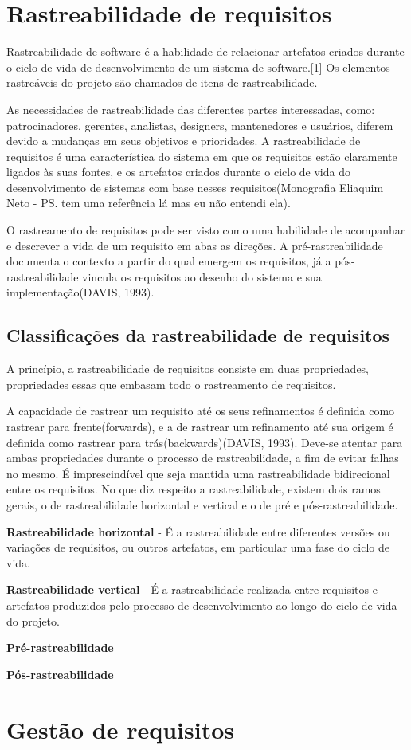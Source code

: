 \section{Rastreabilidade de requisitos}
Rastreabilidade de software é a habilidade de relacionar artefatos criados durante o ciclo de vida de desenvolvimento de um sistema de software.[1] Os elementos rastreáveis do projeto são chamados de itens de rastreabilidade.

As necessidades de rastreabilidade das diferentes partes interessadas, como: patrocinadores, gerentes, analistas, designers, mantenedores e usuários, diferem devido a mudanças em seus objetivos e prioridades. A rastreabilidade de requisitos é uma característica do sistema em que os requisitos estão claramente ligados às suas fontes, e os artefatos criados durante o ciclo de vida do desenvolvimento de sistemas com base nesses requisitos(Monografia Eliaquim Neto - PS. tem uma referência lá mas eu não entendi ela).

O rastreamento de requisitos pode ser visto como uma habilidade de acompanhar e descrever a vida de um requisito em abas as direções. A pré-rastreabilidade documenta o contexto a partir do qual emergem os requisitos, já a pós-rastreabilidade vincula os requisitos ao desenho do sistema e sua implementação(DAVIS, 1993).
\subsection{Classificações da rastreabilidade de requisitos}
A princípio, a rastreabilidade de requisitos consiste em duas propriedades, propriedades essas que embasam todo o rastreamento de requisitos.

A capacidade de rastrear um requisito até os seus refinamentos é definida como rastrear para frente(forwards), e a de rastrear um refinamento até sua origem é definida como rastrear para trás(backwards)(DAVIS, 1993). Deve-se atentar para ambas propriedades durante o processo de rastreabilidade, a fim de evitar falhas no mesmo. É imprescindível que seja mantida uma rastreabilidade bidirecional entre os requisitos.
No que diz respeito a rastreabilidade, existem dois ramos gerais, o de rastreabilidade horizontal e vertical e o de pré e pós-rastreabilidade.

\textbf{Rastreabilidade horizontal} - É a rastreabilidade entre diferentes versões ou variações de requisitos, ou outros artefatos, em particular uma fase do ciclo de vida.

\textbf{Rastreabilidade vertical} - É a rastreabilidade realizada entre requisitos e artefatos produzidos pelo processo de desenvolvimento ao longo do ciclo de vida do projeto.

\textbf{Pré-rastreabilidade}

\textbf{Pós-rastreabilidade}

\section{Gestão de requisitos}